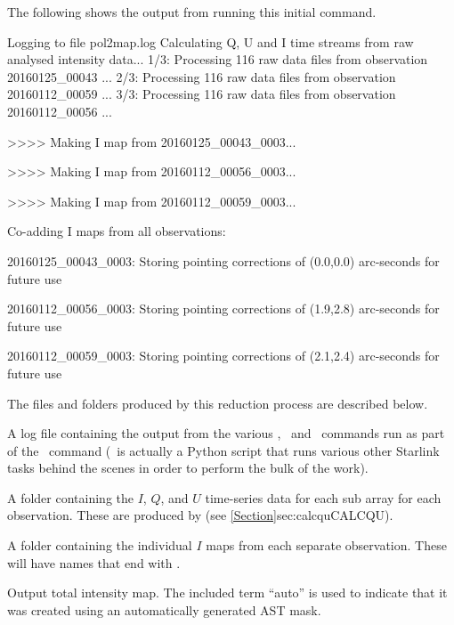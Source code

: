 The following shows the output from running this initial 
command.

\begin{terminalv}
Logging to file pol2map.log
Calculating Q, U and I time streams from raw analysed intensity data...
   1/3: Processing 116 raw data files from observation 20160125_00043 ...
   2/3: Processing 116 raw data files from observation 20160112_00059 ...
   3/3: Processing 116 raw data files from observation 20160112_00056 ...

>>>>   Making I map from 20160125_00043_0003...

>>>>   Making I map from 20160112_00056_0003...

>>>>   Making I map from 20160112_00059_0003...

Co-adding I maps from all observations:

20160125_00043_0003: Storing pointing corrections of (0.0,0.0) arc-seconds
for future use

20160112_00056_0003: Storing pointing corrections of (1.9,2.8) arc-seconds
for future use

20160112_00059_0003: Storing pointing corrections of (2.1,2.4) arc-seconds
for future use

\end{terminalv}

The files and folders produced by this reduction process are described below.

\begin{aligndesc}
\item[\file{pol2map.log}] A log file containing the output from the
  various \SMURF, \KAPPA\ and \POLPACK\ commands run as part of the \poltwomap\
  command (\ is actually a Python script that runs various other
  Starlink tasks behind the scenes in order to perform the bulk of the work).

\item[\file{qudata/}] A folder containing the $I$, $Q$, and $U$ time-series data
  for each sub array for each observation. These are produced by
  \task{calcqu} (see  \cref{Section}{sec:calcqu}{CALCQU}).

\item[\file{maps/}] A folder containing the individual $I$ maps from
  each separate observation. These will have names that end with
  \file{$\_$imap.sdf}.

\item[\file{iauto.sdf}] Output total intensity map. The included term ``auto'' is
  used to indicate that it was created using an automatically generated
  AST mask.

\end{aligndesc}

